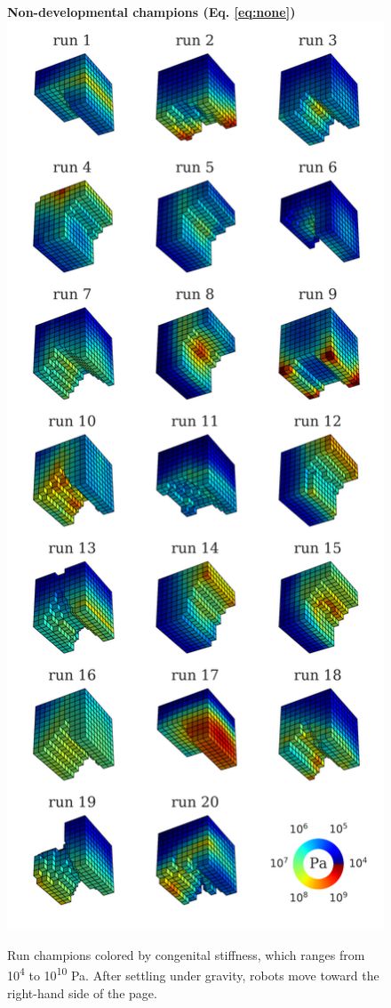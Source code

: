 \begin{figure}%
\centering
{\large \textbf{Non-developmental champions (Eq. \ref{eq:none})}}
\includegraphics[width=0.5\linewidth]{Chapter06/img/zero_run_champs}
\caption{\label{fig6:none} Run champions colored by congenital stiffness, which ranges from 10\textsuperscript{4} to 10\textsuperscript{10} Pa. After settling under gravity, robots move toward the right-hand side of the page.}
\end{figure}


